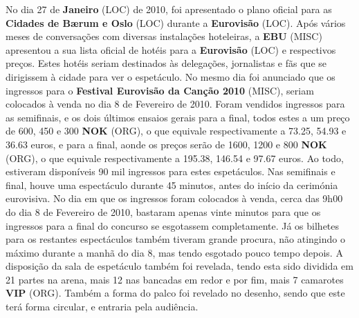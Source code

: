 \documentclass[12pt,a4paper]{article}
\begin{document}
No dia 27 de \textbf{Janeiro} (LOC) de 2010, foi apresentado o plano oficial para as \textbf{Cidades de Bærum e Oslo} (LOC) durante a \textbf{Eurovisão} (LOC). Após vários meses de conversações com diversas instalações hoteleiras, a \textbf{EBU} (MISC) apresentou a sua lista oficial de hotéis para a \textbf{Eurovisão} (LOC) e respectivos preços. Estes hotéis seriam destinados às delegações, jornalistas e fãs que se dirigissem à cidade para ver o espetáculo. No mesmo dia foi anunciado que os ingressos para o \textbf{Festival Eurovisão da Canção 2010} (MISC), seriam colocados à venda no dia 8 de Fevereiro de 2010. Foram vendidos ingressos para as semifinais, e os dois últimos ensaios gerais para a final, todos estes a um preço de 600, 450 e 300 \textbf{NOK} (ORG), o que equivale respectivamente a 73.25, 54.93 e 36.63 euros, e para a final, aonde os preços serão de 1600, 1200 e 800 \textbf{NOK} (ORG), o que equivale respectivamente a 195.38, 146.54 e 97.67 euros. Ao todo, estiveram disponíveis 90 mil ingressos para estes espetáculos. Nas semifinais e final, houve uma espectáculo durante 45 minutos, antes do início da cerimónia eurovisiva. No dia em que os ingressos foram colocados à venda, cerca das 9h00 do dia 8 de Fevereiro de 2010, bastaram apenas vinte minutos para que os ingressos para a final do concurso se esgotassem completamente. Já os bilhetes para os restantes espectáculos também tiveram grande procura, não atingindo o máximo durante a manhã do dia 8, mas tendo esgotado pouco tempo depois. A disposição da sala de espetáculo também foi revelada, tendo esta sido dividida em 21 partes na arena, mais 12 nas bancadas em redor e por fim, mais 7 camarotes \textbf{VIP} (ORG). Também a forma do palco foi revelado no desenho, sendo que este terá forma circular, e entraria pela audiência.
\end{document}
